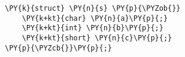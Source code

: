 \begin{Verbatim}[commandchars=\\\{\}]
\PY{k}{struct} \PY{n}{s} \PY{p}{\PYZob{}}
    \PY{k+kt}{char} \PY{n}{a}\PY{p}{;}
    \PY{k+kt}{int} \PY{n}{b}\PY{p}{;}
    \PY{k+kt}{short} \PY{n}{c}\PY{p}{;}
\PY{p}{\PYZcb{}}\PY{p}{;}
\end{Verbatim}
